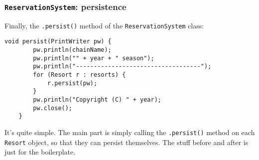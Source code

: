 \subsubsection{\texttt{ReservationSystem}: persistence}

Finally, the \texttt{.persist()} method of the \texttt{ReservationSystem}
class:

\begin{Verbatim}[fontsize=\small,samepage=true,frame=single]
    void persist(PrintWriter pw) {
        pw.println(chainName);
        pw.println("" + year + " season");
        pw.println("-----------------------------------");
        for (Resort r : resorts) {
            r.persist(pw);
        }
        pw.println("Copyright (C) " + year);
        pw.close();
    }
\end{Verbatim}

It's quite simple. The main part is simply calling the \texttt{.persist()}
method on each \texttt{Resort} object, so that they can persist themselves.
The stuff before and after is just for the boilerplate.

